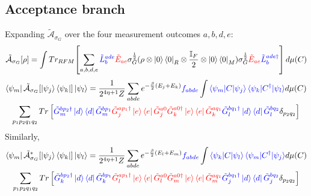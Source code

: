 \documentclass[aps,floatfix,10pt,amssymb,amsfont,amsmath,superscriptaddress,float,nofootinbib,longbibliography,nobalancelastpage,twocolumn]{revtex4-2}
\begin{document}
\subsection{Acceptance branch}

Expanding $\tilde{\mathcal{A}}_{\sigma_G}$ over the four measurement outcomes $a,b,d,e$:
    \begin{equation}
    \tilde{\mathcal{A}}_{\sigma_G}[\rho] = \int Tr_{RFM}\!\left[\sum_{a,b,d,e}\textcolor{blue}{\tilde L^{ade}_b} \textcolor{red}{\tilde E_{ae}} \sigma_G^{\frac{1}{2}} (\rho\otimes \ket{0}\bra{0}_R \otimes \frac{\mathbb{I}_F}{2}\otimes \ket{0}\bra{0}_M) \sigma_G^{\frac{1}{2}}\textcolor{red}{\tilde E_{ae}}\textcolor{blue}{\tilde L^{ade\dagger}_b}\right] d\mu(C)
    \label{eq:Aexpand}
\end{equation}
\begin{multline}
    \bra{\psi_m}\tilde{\mathcal{A}}_{\sigma_G}[\ket{\psi_j}\bra{\psi_k}]\ket{\psi_l}=\frac{1}{2^{4\eta+1}Z} \sum_{abde} e^{-\frac{\beta}{2}(E_j+E_k)}\textcolor{blue}{f_{abde}} \int \textcolor{blue}{\braket{\psi_m|C|\psi_j}\braket{\psi_k|C^{\dagger}|\psi_l}} d\mu(C)\\\sum_{p_1p_2q_1 q_2}Tr\left[\textcolor{blue}{\tilde G^{bp_2\dagger}_m\ket{d}\bra{d}\tilde G^{bp_1}_m} \textcolor{red}{\tilde G_j^{ap_1\dagger}\ket{e}\bra{e}\tilde G_j^{a0}\tilde G_k^{a0\dagger}\ket{e}\bra{e}\tilde G_k^{aq_1}} \textcolor{blue}{\tilde G^{bq_1\dagger}_l\ket{d}\bra{d}\tilde G^{bq_2}_l} \delta_{p_2q_2}\right]
    \label{eq:Arho}
\end{multline}
Similarly,
\begin{multline}
   \bra{\psi_m}\tilde{\mathcal{A}}^*_{\sigma_G}[\ket{\psi_j}\bra{\psi_k}]\ket{\psi_l} =\frac{1}{2^{4\eta+1}Z} \sum_{abde} e^{-\frac{\beta}{2}(E_l+E_m)}\textcolor{blue}{f_{abde}} \int \textcolor{blue}{\braket{\psi_k|C|\psi_l}\braket{\psi_m|C^{\dagger}|\psi_j}} d\mu(C)\\\sum_{p_1p_2 q_1 q_2} Tr\left[\textcolor{blue}{\tilde G^{bp_2\dagger}_k\ket{d}\bra{d}\tilde G^{bp_1}_k} \textcolor{red}{\tilde G_l^{ap_1\dagger}\ket{e}\bra{e}\tilde G_l^{a0}\tilde G_m^{a0\dagger}\ket{e}\bra{e}\tilde G_m^{aq_1}} \textcolor{blue}{\tilde G^{bq_1\dagger}_j\ket{d}\bra{d}\tilde G^{bq_2}_j } \delta_{p_2q_2}\right]
    \label{eq:A*rho}
\end{multline}
\end{document}
